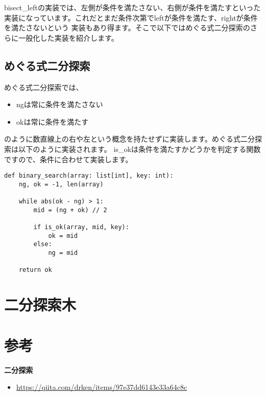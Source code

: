 \documentclass{jlreq}
\begin{document}
bisect\_leftの実装では、左側が条件を満たさない、右側が条件を満たすといった実装になっています。これだとまだ条件次第でleftが条件を満たす、rightが条件を満たさないという
実装もあり得ます。そこで以下ではめぐる式二分探索のさらに一般化した実装を紹介します。

\subsection{めぐる式二分探索}

めぐる式二分探索では、

\begin{itemize}
  \item ngは常に条件を満たさない
  \item okは常に条件を満たす
\end{itemize}

のように数直線上の右や左という概念を持たせずに実装します。めぐる式二分探索は以下のように実装されます。
is\_okは条件を満たすかどうかを判定する関数ですので、条件に合わせて実装します。

\begin{lstlisting}[caption=めぐる式二分探索, frame=TRBL, label={megru}]
def binary_search(array: list[int], key: int):
    ng, ok = -1, len(array)
    
    while abs(ok - ng) > 1:
        mid = (ng + ok) // 2
        
        if is_ok(array, mid, key):
            ok = mid
        else:
            ng = mid
    
    return ok
\end{lstlisting}

\newpage

\section{二分探索木}


\section{参考}
\textbf{二分探索}

\begin{itemize}
  \item \url{https://qiita.com/drken/items/97e37dd6143e33a64c8c}
\end{itemize}
\end{document}
